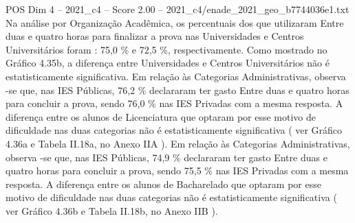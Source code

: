 \begin{textsample}{POS Dim 4 – 2021\_c4 – Score 2.00 – 2021\_c4/enade\_2021\_geo\_b7744036e1.txt}
Na análise por Organização Acadêmica, os percentuais dos que utilizaram Entre duas e quatro horas para finalizar a prova nas Universidades e Centros Universitários foram : 75,0 \% e 72,5 \%, respectivamente.
Como mostrado no Gráfico 4.35b, a diferença entre Universidades e Centros Universitários não é estatisticamente significativa.
Em relação às Categorias Administrativas, observa -se que, nas IES Públicas, 76,2 \% declararam ter gasto Entre duas e quatro horas para concluir a prova, sendo 76,0 \% nas IES Privadas com a mesma resposta.
A diferença entre os alunos de Licenciatura que optaram por esse motivo de dificuldade nas duas categorias não é estatisticamente significativa ( ver Gráfico 4.36a e Tabela II.18a, no Anexo IIA ).
Em relação às Categorias Administrativas, observa -se que, nas IES Públicas, 74,9 \% declararam ter gasto Entre duas e quatro horas para concluir a prova, sendo 75,5 \% nas IES Privadas com a mesma resposta.
A diferença entre os alunos de Bacharelado que optaram por esse motivo de dificuldade nas duas categorias não é estatisticamente significativa ( ver Gráfico 4.36b e Tabela II.18b, no Anexo IIB ).

\end{textsample}
